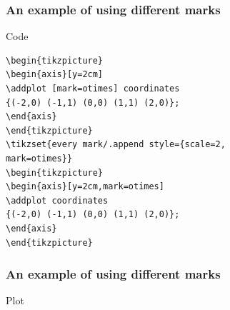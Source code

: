 \documentclass{beamer}
\begin{document}
\begin{frame}[fragile]
\frametitle{An example of using different marks}
\begin{block}{Code}
\begin{verbatim}
\begin{tikzpicture}
\begin{axis}[y=2cm]
\addplot [mark=otimes] coordinates
{(-2,0) (-1,1) (0,0) (1,1) (2,0)};
\end{axis}
\end{tikzpicture}
\tikzset{every mark/.append style={scale=2,
mark=otimes}}
\begin{tikzpicture}
\begin{axis}[y=2cm,mark=otimes]
\addplot coordinates
{(-2,0) (-1,1) (0,0) (1,1) (2,0)};
\end{axis}
\end{tikzpicture}
\end{verbatim}
\end{block}
\end{frame}
\begin{frame}[fragile]
\frametitle{An example of using different marks}
\begin{block}{Plot}
\end{block}
\end{frame}
\end{document}
